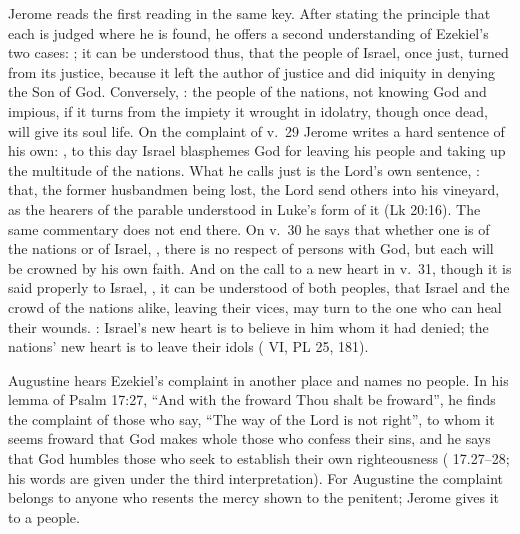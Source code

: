 Jerome reads the first reading in the same key. After stating the principle
that each is judged where he is found, he offers a second understanding of
Ezekiel's two cases: ; it can be understood thus, that the people
of Israel, once just, turned from its justice, because it left the author of
justice and did iniquity in denying the Son of God. Conversely, : the people of the nations, not knowing God and impious, if it
turns from the impiety it wrought in idolatry, though once dead, will give its
soul life. On the complaint of v.~29 Jerome writes a hard sentence of his own:
, to this day Israel blasphemes God for
leaving his people and taking up the multitude of the nations. What he calls
just is the Lord's own sentence, : that,
the former husbandmen being lost, the Lord send others into his vineyard, as
the hearers of the parable understood in Luke's form of it (Lk 20:16). The
same commentary does not end there. On v.~30 he says
that whether one is of the nations or of Israel, , there is no
respect of persons with God, but each will be crowned by his own faith. And on
the call to a new heart in v.~31, though it is said properly to Israel,
, it can be understood of both peoples, that Israel and the
crowd of the nations alike, leaving their vices, may turn to the one who can
heal their wounds. : Israel's new heart is to
believe in him whom it had denied; the nations' new heart is to leave their
idols ( VI, PL 25, 181).

Augustine hears Ezekiel's complaint in another place and names no people. In
his lemma of Psalm 17:27, ``And with the froward Thou shalt be froward'', he
finds the complaint of those who say, ``The way of the Lord is not right'', to whom it
seems froward that God makes whole those who confess their sins, and he says
that God humbles those who seek to establish their own righteousness
( 17.27--28; his words are given under the third
interpretation). For Augustine the complaint belongs to anyone who resents the
mercy shown to the penitent; Jerome gives it to a people.

